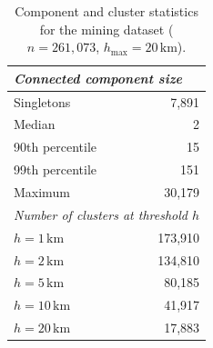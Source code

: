 \begin{table}[ht]
\caption{Component and cluster statistics for the mining dataset
  ($n = 261{,}073$, $h_{\max} = 20\,\text{km}$).}
\label{tab:mining_components}
\small
\begin{tabular}{lr}
\toprule
\multicolumn{2}{l}{\textit{Connected component size}} \\
\midrule
Singletons        & 7{,}891 \\
Median            & 2 \\
90th percentile   & 15 \\
99th percentile   & 151 \\
Maximum           & 30{,}179 \\
\midrule
\multicolumn{2}{l}{\textit{Number of clusters at threshold $h$}} \\
\midrule
$h = 1\,\text{km}$   & 173{,}910 \\
$h = 2\,\text{km}$   & 134{,}810 \\
$h = 5\,\text{km}$   & 80{,}185 \\
$h = 10\,\text{km}$   & 41{,}917 \\
$h = 20\,\text{km}$   & 17{,}883 \\
\bottomrule
\end{tabular}
\end{table}